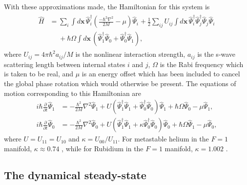 With these approximations made, the Hamiltonian for this system is
\begin{align}
    \label{Peaks:InitialHamiltonian}
    \begin{split}
    \hat{H} &= \sum_i \int d\bm{x}\, \hat{\Psi}_i^\dagger \left(\frac{-\hbar^2 \nabla^2}{2 M} - \mu\right)\hat{\Psi}_i^{\phantom{\dagger}} + \frac{1}{2} \sum_{i j} U_{i j}\int d\bm{x}\, \hat{\Psi}_i^\dagger \hat{\Psi}_j^\dagger \hat{\Psi}_j^{\phantom{\dagger}} \hat{\Psi}_i^{\phantom{\dagger}}\\
            &\phantom{=} + \hbar \Omega \int d\bm{x}\, \left(\hat{\Psi}_1^\dagger \hat{\Psi}_0^{\phantom{\dagger}} + \hat{\Psi}_0^\dagger \hat{\Psi}_1^{\phantom{\dagger}}\right),
    \end{split}
\end{align}
where $U_{ij} = 4\pi \hbar^2 a_{ij}/M$ is the nonlinear interaction strength, $a_{ij}$ is the s-wave scattering length between internal states $i$ and $j$, $\Omega$ is the Rabi frequency which is taken to be real, and $\mu$ is an energy offset which has been included to cancel the global phase rotation which would otherwise be present. The equations of motion corresponding to this Hamiltonian are
\begin{subequations}
    \label{Peaks:OperatorEquationsOfMotion}
    \begin{align}
    i \hbar \frac{\partial }{\partial t}\hat{\Psi}_1  &= -\frac{\hbar^2}{2M}\nabla^2 \hat{\Psi}_1  + U \left(\hat{\Psi}_1^\dagger \hat{\Psi}_1^{\phantom{\dagger}} + \hat{\Psi}_0^\dagger \hat{\Psi}_0^{\phantom{\dagger}}\right) \hat{\Psi}_1 + \hbar \Omega \hat{\Psi}_0 - \mu \hat{\Psi}_1,  \\
    i \hbar \frac{\partial }{\partial t}\hat{\Psi}_0 &= -\frac{\hbar^2}{2M} \nabla^2 \hat{\Psi}_0 + U \left(\hat{\Psi}_1^\dagger \hat{\Psi}_1^{\phantom{\dagger}} + \kappa \hat{\Psi}_0^\dagger \hat{\Psi}_0^{\phantom{\dagger}} \right) \hat{\Psi}_0 + \hbar \Omega \hat{\Psi}_1 - \mu \hat{\Psi}_0,
    \end{align}
\end{subequations}
where $U=U_{11}=U_{10}$ and $\kappa = U_{00}/U_{11}$.  For metastable helium in the $F=1$ manifold, $\kappa \approx 0.74$ \citep{Leo:2001}, while for Rubidium in the $F=1$ manifold, $\kappa = 1.002$ \cite{Kempen:2002,Widera:2006}.

\subsection{The dynamical steady-state}
\label{Peaks:MeanFieldPeriodicity}

